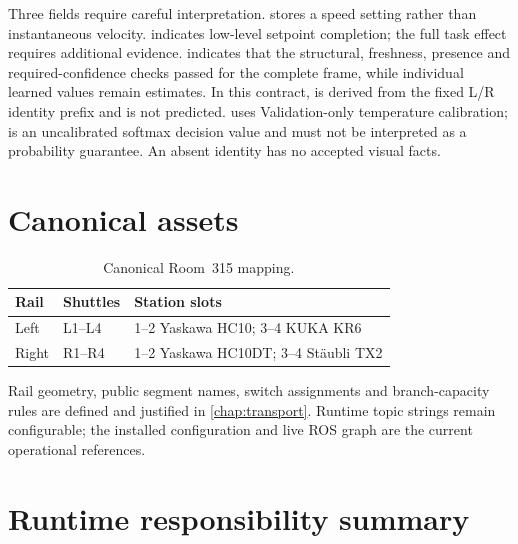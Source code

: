 Three fields require careful interpretation.  stores a
speed setting rather than instantaneous velocity.
 indicates low-level setpoint completion; the full
task effect requires additional evidence. 
indicates that the structural, freshness, presence and required-confidence
checks passed for the complete frame, while individual learned values remain
estimates. In this contract,  is derived from the fixed L/R identity prefix and
is not predicted.  uses Validation-only temperature
calibration;  is an uncalibrated softmax decision value
and must not be interpreted as a probability guarantee. An absent identity has
no accepted visual facts.

\section{Canonical assets}

\begin{table}[htbp]
\centering
\caption{Canonical Room~315 mapping.}
\begin{tabular}{@{}lll@{}}
\toprule
\textbf{Rail} & \textbf{Shuttles} & \textbf{Station slots}\\
\midrule
Left & L1--L4 & 1--2 Yaskawa HC10; 3--4 KUKA KR6\\
\tablerowrule
Right & R1--R4 & 1--2 Yaskawa HC10DT; 3--4 Stäubli TX2\\
\bottomrule
\end{tabular}
\end{table}

Rail geometry, public segment names, switch assignments and branch-capacity
rules are defined and justified in \cref{chap:transport}. Runtime topic strings
remain configurable; the installed configuration and live ROS graph are the
current operational references.

\clearpage
\section{Runtime responsibility summary}

